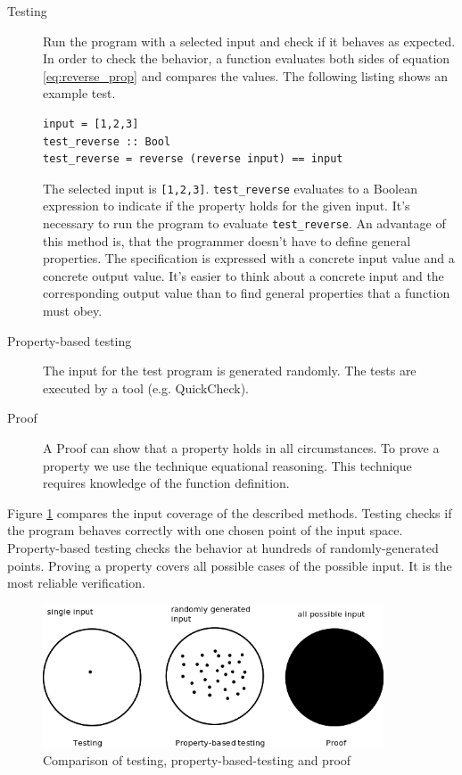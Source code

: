 \begin{description}
\item[Testing] Run the program with a selected input and check if it behaves as expected. In order to check the behavior, a function evaluates both sides of equation \ref{eq:reverse_prop} and compares the values. The following listing shows an example test.

\begin{lstlisting}[caption={Function definition for testing},label={lst:testing}]
input = [1,2,3]
test_reverse :: Bool
test_reverse = reverse (reverse input) == input
\end{lstlisting}

The selected input is \verb|[1,2,3]|. \verb|test_reverse| evaluates to a Boolean expression to indicate if the property holds for the given input. It's necessary to run the program to evaluate \verb|test_reverse|.
An advantage of this method is, that the programmer doesn't have to define general properties. The specification is expressed with a concrete input value and a concrete output value. It's easier to think about a concrete input and the corresponding output value than to find general properties that a function must obey.
\item[Property-based testing] The input for the test program is generated randomly. The tests are executed by a tool (e.g. QuickCheck).
\item[Proof] A Proof can show that a property holds in all circumstances. To prove a property we use the technique equational reasoning. This technique requires knowledge of the function definition.
\end{description}

Figure \ref{fig:property_validation} compares the input coverage of the described methods. Testing checks if the program behaves correctly with one chosen point of the input space. Property-based testing checks the behavior at hundreds of randomly-generated points. Proving a property covers all possible cases of the possible input. It is the most reliable verification.

\begin{figure}
  \centering
     \includegraphics[width=0.9\textwidth]{testing}
  \caption{Comparison of testing, property-based-testing and proof}
  \label{fig:property_validation}
\end{figure}

